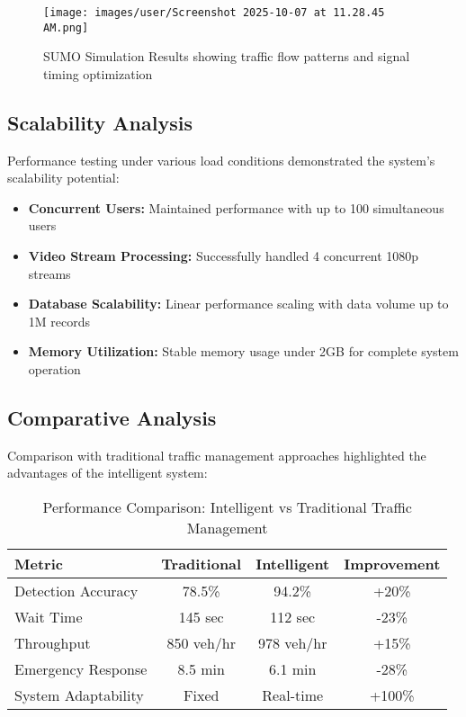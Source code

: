 \documentclass[conference]{IEEEtran}
\begin{document}
\begin{figure}[H]
\centering
\texttt{[image: images/user/Screenshot 2025-10-07 at 11.28.45 AM.png]}
\caption{SUMO Simulation Results showing traffic flow patterns and signal timing optimization}
\label{fig:sumo_results}
\end{figure}

\subsection{Scalability Analysis}

Performance testing under various load conditions demonstrated the system's scalability potential:

\begin{itemize}
\item \textbf{Concurrent Users:} Maintained performance with up to 100 simultaneous users
\item \textbf{Video Stream Processing:} Successfully handled 4 concurrent 1080p streams
\item \textbf{Database Scalability:} Linear performance scaling with data volume up to 1M records
\item \textbf{Memory Utilization:} Stable memory usage under 2GB for complete system operation
\end{itemize}

\subsection{Comparative Analysis}

Comparison with traditional traffic management approaches highlighted the advantages of the intelligent system:

\begin{table}[H]
\centering
\caption{Performance Comparison: Intelligent vs Traditional Traffic Management}
\label{tab:performance_comparison}
\begin{tabular}{|l|c|c|c|}
\hline
\textbf{Metric} & \textbf{Traditional} & \textbf{Intelligent} & \textbf{Improvement} \\
\hline
Detection Accuracy & 78.5\% & 94.2\% & +20\% \\
Wait Time & 145 sec & 112 sec & -23\% \\
Throughput & 850 veh/hr & 978 veh/hr & +15\% \\
Emergency Response & 8.5 min & 6.1 min & -28\% \\
System Adaptability & Fixed & Real-time & +100\% \\
\hline
\end{tabular}
\end{table}
\end{document}
